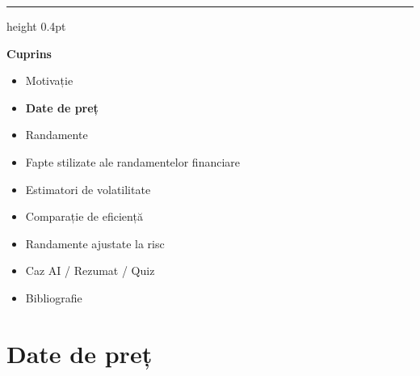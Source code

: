 \documentclass[9pt, aspectratio=169, t]{beamer}
\theoremstyle{definition}
\begin{document}
{
\begin{frame}{}
    {\color{FooterGray}\hrule height 0.4pt}
    \vspace{0.1cm}
    {\Large\textcolor{IDAred}{\textbf{Cuprins}}}
    \vspace{0.2cm}
    \begin{itemize}
        \item Motivație \checkmark
        \item \textbf{Date de preț}
        \item Randamente
        \item Fapte stilizate ale randamentelor financiare
        \item Estimatori de volatilitate
        \item Comparație de eficiență
        \item Randamente ajustate la risc
        \item Caz AI / Rezumat / Quiz
        \item Bibliografie
    \end{itemize}
\end{frame}
}

\section{Date de preț}
\end{document}
